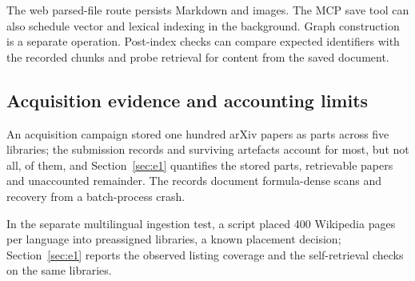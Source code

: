 The web parsed-file route persists Markdown and images. The MCP save tool
can also schedule vector and lexical indexing in the background. Graph
construction is a separate operation. Post-index checks can compare
expected identifiers with the recorded chunks and probe retrieval for
content from the saved document.

\subsection{Acquisition evidence and accounting limits}

An acquisition campaign stored one hundred arXiv papers as parts across
five libraries; the submission records and surviving artefacts account
for most, but not all, of them, and Section~\ref{sec:e1} quantifies the
stored parts, retrievable papers and unaccounted remainder. The records
document formula-dense scans and recovery from a batch-process crash.

In the separate multilingual ingestion test, a script placed 400 Wikipedia
pages per language into preassigned libraries, a known placement decision;
Section~\ref{sec:e1} reports the observed listing coverage and the
self-retrieval checks on the same libraries.

